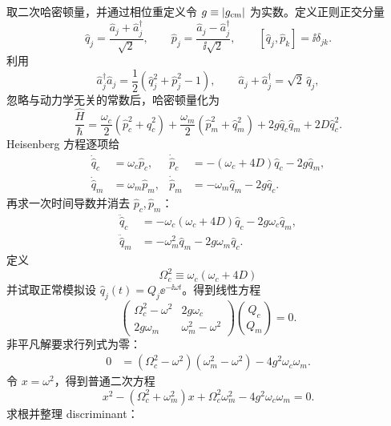 \begin{exbox}
取二次哈密顿量，并通过相位重定义令 $g\equiv|g_{\rm cm}|$ 为实数。定义正则正交分量
\begin{equation*}
 \hat q_j=\frac{\hat a_j+\hat a_j^\dagger}{\sqrt2},
 \qquad
 \hat p_j=\frac{\hat a_j-\hat a_j^\dagger}{\ii\sqrt2},
 \qquad [\hat q_j,\hat p_k]=\ii\delta_{jk}.
\end{equation*}
利用
\begin{equation*}
 \hat a_j^\dagger\hat a_j=\frac12(\hat q_j^2+\hat p_j^2-1),
 \qquad
 \hat a_j+\hat a_j^\dagger=\sqrt2\,\hat q_j,
\end{equation*}
忽略与动力学无关的常数后，哈密顿量化为
\begin{equation*}
 \frac{\hat H}{\hbar}
 =\frac{\omega_c}{2}(\hat p_c^2+\hat q_c^2)
 +\frac{\omega_m}{2}(\hat p_m^2+\hat q_m^2)
 +2g\hat q_c\hat q_m+2D\hat q_c^2.
\end{equation*}
Heisenberg 方程逐项给
\begin{align*}
 \dot{\hat q}_c&=\omega_c \hat p_c,&
 \dot{\hat p}_c&=-(\omega_c+4D)\hat q_c-2g\hat q_m,\\
 \dot{\hat q}_m&=\omega_m \hat p_m,&
 \dot{\hat p}_m&=-\omega_m \hat q_m-2g\hat q_c.
\end{align*}
再求一次时间导数并消去 $\hat p_c,\hat p_m$：
\begin{align*}
 \ddot{\hat q}_c
 &=-\omega_c(\omega_c+4D)\hat q_c-2g\omega_c \hat q_m,\\
 \ddot{\hat q}_m
 &=-\omega_m^2\hat q_m-2g\omega_m \hat q_c.
\end{align*}
定义
\begin{equation*}
 \Omega_c^2\equiv\omega_c(\omega_c+4D)
\end{equation*}
并试取正常模拟设 $\hat q_j(t)=Q_j \ee^{-\ii\omega t}$。得到线性方程
\begin{equation*}
 \begin{pmatrix}
 \Omega_c^2-\omega^2 & 2g\omega_c\\
 2g\omega_m & \omega_m^2-\omega^2
 \end{pmatrix}
 \binom{Q_c}{Q_m}=0.
\end{equation*}
非平凡解要求行列式为零：
\begin{align*}
 0
 &=(\Omega_c^2-\omega^2)(\omega_m^2-\omega^2)
 -4g^2\omega_c\omega_m.
\end{align*}
令 $x=\omega^2$，得到普通二次方程
\begin{equation*}
 x^2-(\Omega_c^2+\omega_m^2)x
 +\Omega_c^2\omega_m^2-4g^2\omega_c\omega_m=0.
\end{equation*}
求根并整理 discriminant：
\begin{align*}

\end{align*}
\end{exbox}
